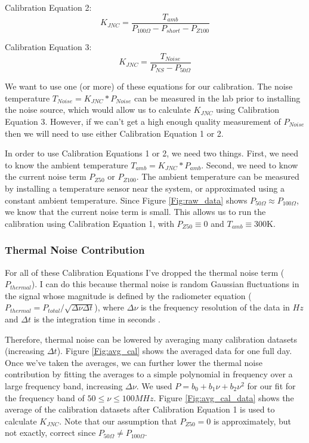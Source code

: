 Calibration Equation 2:
\begin{equation}
K_{JNC} = \frac{T_{amb}}{P_{100 \Omega} - P_{short}-P_{Z100}}
\end{equation}

Calibration Equation  3:
\begin{equation}
K_{JNC} = \frac{T_{Noise}}{P_{NS}-P_{50 \Omega}}
\end{equation}

We want to use one (or more) of these equations for our calibration. The noise temperature $T_{Noise}= K_{JNC}*P_{Noise}$ can be measured in the lab prior to installing the noise source, which would allow us to calculate $K_{JNC}$ using Calibration Equation 3. However, if we can't get a high enough quality measurement of $P_{Noise}$ then we will need to use either Calibration Equation 1 or 2. 

In order to use Calibration Equations 1 or 2, we need two things. First, we need to know the ambient temperature $T_{amb} = K_{JNC}*P_{amb}$. Second, we need to know the current noise term $P_{Z50}$ or $P_{Z100}$. The ambient temperature can be measured by installing a temperature sensor near the system, or approximated using a constant ambient temperature. Since Figure \ref{Fig:raw_data} shows $P_{50 \Omega} \approx P_{100 \Omega}$, we know that the current noise term is small. This allows us to run the calibration using Calibration Equation 1, with $P_{Z50} \equiv 0$ and $T_{amb} \equiv 300$K. 

\subsubsection{Thermal Noise Contribution}

For all of these Calibration Equations I've dropped the thermal noise term ($P_{thermal}$). I can do this because thermal noise is random Gaussian fluctuations in the signal whose magnitude is defined by the radiometer equation ($P_{thermal} = P_{total}/\sqrt{\Delta \nu \Delta t}$), where $\Delta \nu$ is the frequency resolution of the data in $Hz$ and $\Delta t$ is the integration time in seconds \cite{stutzman1981}. 

Therefore, thermal noise can be lowered by averaging many calibration datasets (increasing $\Delta t$). Figure \ref{Fig:avg_cal} shows the averaged data for one full day. Once we've taken the averages, we can further lower the thermal noise contribution by fitting the averages to a simple polynomial in frequency over a large frequency band, increasing $\Delta \nu$. We used $P = b_0 + b_1 \nu +b_2 \nu^2$ for our fit for the frequency band of $50 \leq \nu \leq 100MHz$. Figure \ref{Fig:avg_cal_data} shows the average of the calibration datasets after Calibration Equation 1 is used to calculate $K_{JNC}$. Note that our assumption that $P_{Z50}=0$ is approximately, but not exactly, correct since $P_{50 \Omega} \neq P_{100 \Omega}$. 

